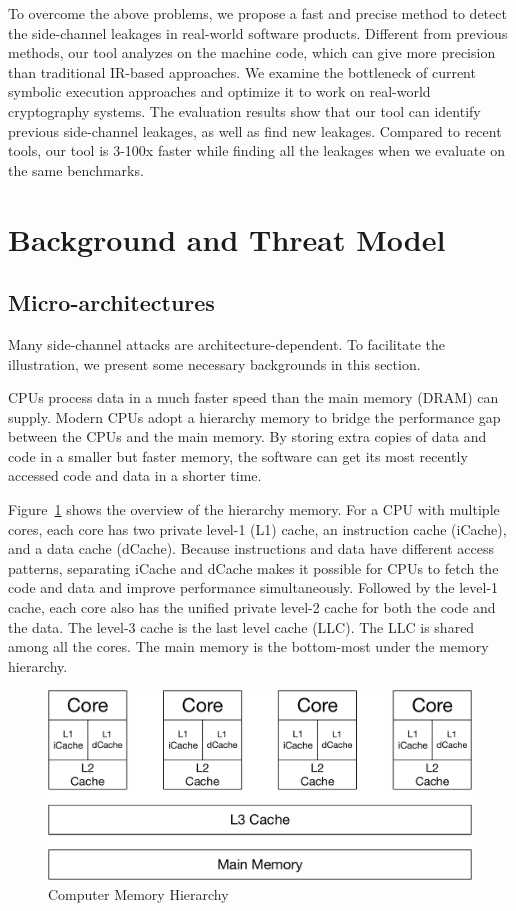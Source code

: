 To overcome the above problems, we propose a fast and precise method to detect the side-channel leakages in real-world software products. Different from previous methods, our tool analyzes on the machine code, which can give more precision than traditional IR-based approaches.  We examine the bottleneck of current symbolic execution approaches and optimize it to work on real-world cryptography systems. The evaluation results show that our tool can identify previous side-channel leakages, as well as find new leakages. Compared to recent tools, our tool is 3-100x faster while finding all the leakages when we evaluate on the same benchmarks.

\section{Background and Threat Model}
\subsection{Micro-architectures}
Many side-channel attacks are architecture-dependent. To facilitate the illustration, we present some necessary backgrounds in this section.

CPUs process data in a much faster speed than the main memory (DRAM) can supply. Modern CPUs adopt a hierarchy memory to bridge the performance gap between the CPUs and the main memory. By storing extra copies of data and code in a smaller but faster memory, the software can get its most recently accessed code and data in a shorter time.

Figure~\ref{fig:memory_hierarchy} shows the overview of the hierarchy memory. For a CPU with multiple cores, each core has two private level-1 (L1) cache, an instruction cache (iCache), and a data cache (dCache). Because instructions and data have different access patterns, separating iCache and dCache makes it possible for CPUs to fetch the code and data and improve performance simultaneously. Followed by the level-1 cache, each core also has the unified private level-2 cache for both the code and the data. The level-3 cache is the last level cache (LLC). The LLC is shared among all the cores. The main memory is the bottom-most under the memory hierarchy. 
\begin{figure}
    \centering
    \includegraphics[width=.65\columnwidth]{./figures/chapter3/architecture.pdf}
    \caption{Computer Memory Hierarchy}\label{fig:memory_hierarchy}
\end{figure}

